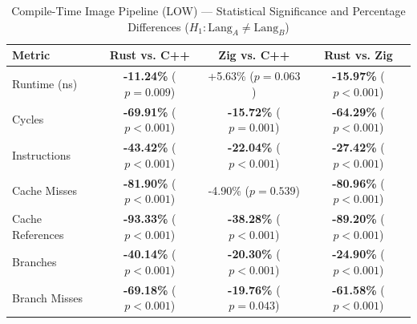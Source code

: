 \begin{table}[htbp]
\centering
\caption{Compile-Time Image Pipeline (LOW) --- Statistical Significance and Percentage Differences ($H_1: \text{Lang}_A \neq \text{Lang}_B$)}
\label{tab:image_pipeline_comptime_LOW_false_false_false}
\begin{tabular}{l ccc}
\toprule
\textbf{Metric} & \textbf{Rust vs. C++} & \textbf{Zig vs. C++} & \textbf{Rust vs. Zig} \\
\midrule
Runtime (ns) & \textbf{-11.24\%} ($p = 0.009$) & +5.63\% ($p = 0.063$) & \textbf{-15.97\%} ($p < 0.001$) \\
Cycles & \textbf{-69.91\%} ($p < 0.001$) & \textbf{-15.72\%} ($p = 0.001$) & \textbf{-64.29\%} ($p < 0.001$) \\
Instructions & \textbf{-43.42\%} ($p < 0.001$) & \textbf{-22.04\%} ($p < 0.001$) & \textbf{-27.42\%} ($p < 0.001$) \\
Cache Misses & \textbf{-81.90\%} ($p < 0.001$) & -4.90\% ($p = 0.539$) & \textbf{-80.96\%} ($p < 0.001$) \\
Cache References & \textbf{-93.33\%} ($p < 0.001$) & \textbf{-38.28\%} ($p < 0.001$) & \textbf{-89.20\%} ($p < 0.001$) \\
Branches & \textbf{-40.14\%} ($p < 0.001$) & \textbf{-20.30\%} ($p < 0.001$) & \textbf{-24.90\%} ($p < 0.001$) \\
Branch Misses & \textbf{-69.18\%} ($p < 0.001$) & \textbf{-19.76\%} ($p = 0.043$) & \textbf{-61.58\%} ($p < 0.001$) \\
\bottomrule
\end{tabular}
\end{table}


